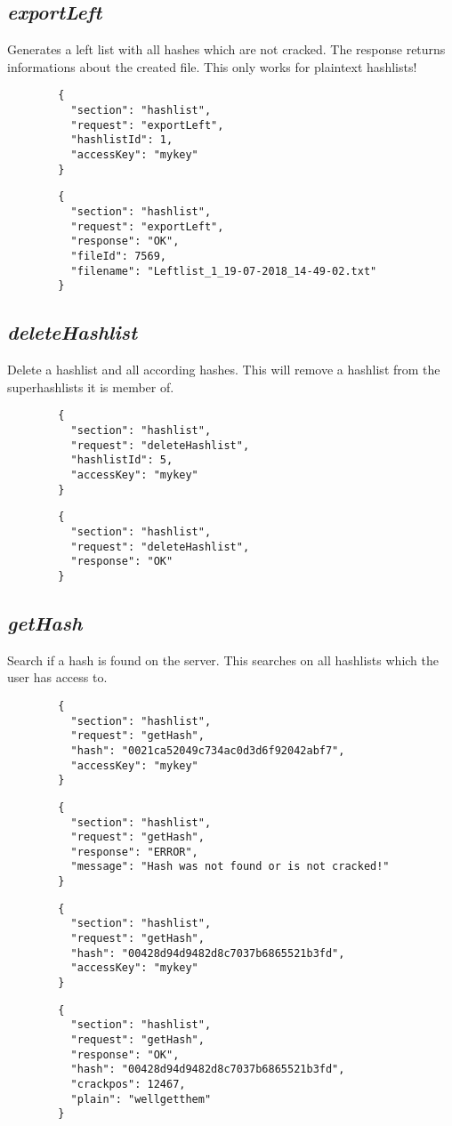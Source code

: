 \subsection*{\textit{exportLeft}}
	Generates a left list with all hashes which are not cracked. The response returns informations about the created file. This only works for plaintext hashlists!
	{
		\color{blue}
		\begin{verbatim}
		{
		  "section": "hashlist",
		  "request": "exportLeft",
		  "hashlistId": 1,
		  "accessKey": "mykey"
		}
		\end{verbatim}
	}
	{
		\color{OliveGreen}
		\begin{verbatim}
		{
		  "section": "hashlist",
		  "request": "exportLeft",
		  "response": "OK",
		  "fileId": 7569,
		  "filename": "Leftlist_1_19-07-2018_14-49-02.txt"
		}
		\end{verbatim}
	}
\subsection*{\textit{deleteHashlist}}
	Delete a hashlist and all according hashes. This will remove a hashlist from the superhashlists it is member of.
	{
		\color{blue}
		\begin{verbatim}
		{
		  "section": "hashlist",
		  "request": "deleteHashlist",
		  "hashlistId": 5,
		  "accessKey": "mykey"
		}
		\end{verbatim}
	}
	{
		\color{OliveGreen}
		\begin{verbatim}
		{
		  "section": "hashlist",
		  "request": "deleteHashlist",
		  "response": "OK"
		}
		\end{verbatim}
	}
\subsection*{\textit{getHash}}
	Search if a hash is found on the server. This searches on all hashlists which the user has access to.
	{
		\color{blue}
		\begin{verbatim}
		{
		  "section": "hashlist",
		  "request": "getHash",
		  "hash": "0021ca52049c734ac0d3d6f92042abf7",
		  "accessKey": "mykey"
		}
		\end{verbatim}
	}
	{
		\color{OliveGreen}
		\begin{verbatim}
		{
		  "section": "hashlist",
		  "request": "getHash",
		  "response": "ERROR",
		  "message": "Hash was not found or is not cracked!"
		}
		\end{verbatim}
	}
	{
		\color{blue}
		\begin{verbatim}
		{
		  "section": "hashlist",
		  "request": "getHash",
		  "hash": "00428d94d9482d8c7037b6865521b3fd",
		  "accessKey": "mykey"
		}
		\end{verbatim}
	}
	{
		\color{OliveGreen}
		\begin{verbatim}
		{
		  "section": "hashlist",
		  "request": "getHash",
		  "response": "OK",
		  "hash": "00428d94d9482d8c7037b6865521b3fd",
		  "crackpos": 12467,
		  "plain": "wellgetthem"
		}
		\end{verbatim}
	}







 